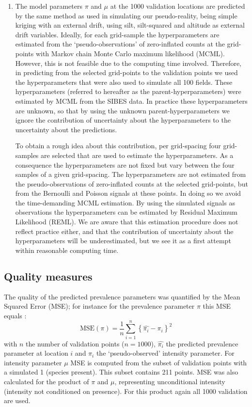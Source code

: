 \documentclass[review]{elsarticle}
\begin{document}
\begin{enumerate}
\item
The model parameters $\pi$ and $\mu$ at the 1000 validation locations are predicted by the same method as used in simulating our pseudo-reality, being simple kriging with an external drift, using silt, silt-squared and altitude as external drift variables. Ideally, for each grid-sample the hyperparameters are estimated from the `pseudo-observations' of zero-inflated counts at the grid-points with Markov chain Monte Carlo maximum likelihood (MCML). However, this is not feasible due to the computing time involved. Therefore, in predicting from the selected grid-points to the validation points we used the hyperparameters that were also used to simulate all 100 fields. These hyperparameters (referred to hereafter as the parent-hyperparameters) were estimated by MCML from the SIBES data. In practice these hyperparameters are unknown, so that by using the unknown parent-hyperparameters we ignore the contribution of uncertainty about the hyperparameters to the uncertainty about the predictions.

To obtain a rough idea about this contribution, per grid-spacing four grid-samples are selected that are used to estimate the hyperparameters. As a consequence the hyperparameters are not fixed but vary between the four samples of a given grid-spacing. The hyperparameters are not estimated from the pseudo-observations of zero-inflated counts at the selected grid-points, but from the Bernoulli and Poisson signals at these points. In doing so we avoid the time-demanding MCML estimation. By using the simulated signals as observations the hyperparameters can be estimated by Residual Maximum Likelihood (REML). We are aware that this estimation procedure does not reflect practice either, and that the contribution of uncertainty about the hyperparameters will be underestimated, but we see it as a first attempt within reasonable computing time.
\end{enumerate}

\subsection{Quality measures}
The quality of the predicted prevalence parameters was quantified by the Mean Squared Error (MSE); for instance for the prevalence parameter $\pi$ this MSE equals :
\begin{equation}
    \text{MSE}(\pi)=\frac{1}{n}\sum_{i=1}^{n} \left\{\hat{\pi_{i}} - \pi_{i} \right\}^{2}
\label{eq:mse}
\end{equation}
with $n$ the number of validation points ($n=1000$), $\hat{\pi_{i}}$ the predicted prevalence parameter at location $i$ and $\pi_{i}$ the `pseudo-observed' intensity parameter. For intensity parameter $\mu$ MSE is computed from the subset of validation points with a simulated 1 (species present). This subset contains 211 points. MSE was also calculated for the product of $\pi$ and $\mu$, representing unconditional intensity (intensity not conditioned on presence). For this product again all 1000 validation are used.
\end{document}
